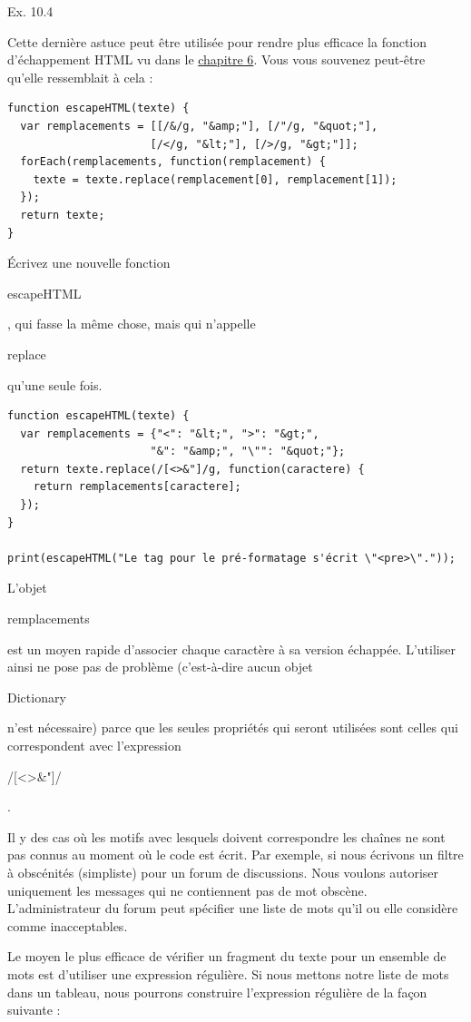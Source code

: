 \documentclass{FramateX}
\renewcommand{\texttt}[1]{\begin{sffamily}{#1}\end{sffamily}}
\begin{document}
Ex. 10.4

Cette dernière astuce peut être utilisée pour rendre plus efficace la
fonction d'échappement HTML vu dans le \href{chapter6.html}{chapitre 6}.
Vous vous souvenez peut-être qu'elle ressemblait à cela :

\begin{lstlisting}
function escapeHTML(texte) {
  var remplacements = [[/&/g, "&amp;"], [/"/g, "&quot;"],
                      [/</g, "&lt;"], [/>/g, "&gt;"]];
  forEach(remplacements, function(remplacement) {
    texte = texte.replace(remplacement[0], remplacement[1]);
  });
  return texte;
}
\end{lstlisting}
Écrivez une nouvelle fonction \texttt{escapeHTML}, qui fasse la même
chose, mais qui n'appelle \texttt{replace} qu'une seule fois.

\begin{lstlisting}
function escapeHTML(texte) {
  var remplacements = {"<": "&lt;", ">": "&gt;",
                      "&": "&amp;", "\"": "&quot;"};
  return texte.replace(/[<>&"]/g, function(caractere) {
    return remplacements[caractere];
  });
}

print(escapeHTML("Le tag pour le pré-formatage s'écrit \"<pre>\"."));
\end{lstlisting}
L'objet \texttt{remplacements} est un moyen rapide d'associer chaque
caractère à sa version échappée. L'utiliser ainsi ne pose pas de
problème (c'est-à-dire aucun objet \texttt{Dictionary} n'est nécessaire)
parce que les seules propriétés qui seront utilisées sont celles qui
correspondent avec l'expression
\texttt{/{[}\textless{}\textgreater{}\&"{]}/}.

\begin{center}\end{center}

Il y des cas où les motifs avec lesquels doivent correspondre les
chaînes ne sont pas connus au moment où le code est écrit. Par exemple,
si nous écrivons un filtre à obscénités (simpliste) pour un forum de
discussions. Nous voulons autoriser uniquement les messages qui ne
contiennent pas de mot obscène. L'administrateur du forum peut spécifier
une liste de mots qu'il ou elle considère comme inacceptables.

Le moyen le plus efficace de vérifier un fragment du texte pour un
ensemble de mots est d'utiliser une expression régulière. Si nous
mettons notre liste de mots dans un tableau, nous pourrons construire
l'expression régulière de la façon suivante :
\end{document}
